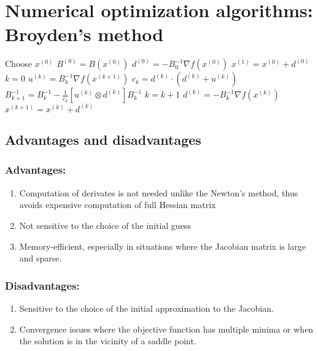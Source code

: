 \documentclass{article}
\begin{document}
\section*{Numerical optimization algorithms: Broyden's method}


\begin{algorithmic}[1]
    \STATE Choose $x^{(0)}$
    \STATE $B^{(0)} = B(x^{(0)})$
    \STATE $d^{(0)} = -B_0^{-1} \nabla f(x^{(0)})$
    \STATE $x^{(1)} = x^{(0)} + d^{(0)}$
    \STATE $k = 0$
        \STATE $u^{(k)} = B_k^{-1} \nabla f(x^{(k+1)})$
        \STATE $c_k = d^{(k)} \cdot (d^{(k)} + u^{(k)})$
	\STATE $B_{k+1}^{-1} = B_k^{-1} - \frac{1}{c_k} [u^{(k)} \otimes d^{(k)}]B_k^{-1}$
        \STATE $k = k+1$
        \STATE $d^{(k)} = -B_k^{-1} \nabla f(x^{(k)})$
        \STATE $x^{(k+1)} = x^{(k)} + d^{(k)}$
    \ENDWHILE
\end{algorithmic}


\subsection*{Advantages and disadvantages}

\subsubsection*{Advantages:} 
\begin{enumerate}
    \item Computation of derivates is not needed unlike the Newton's method, thus avoids expensive computation of full Hessian matrix 
    \item  Not sensitive to the choice of the initial guess 
    \item Memory-efficient, especially in situations where the Jacobian matrix is large and sparse.
\end{enumerate}

\subsubsection*{Disadvantages:} 

\begin{enumerate}
    \item Sensitive to the choice of the initial approximation to the Jacobian.
    \item Convergence issues where the objective function has multiple minima or when the solution is in the vicinity of a saddle point.
\end{enumerate}
\end{document}
